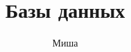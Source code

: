 \documentclass[13pt,a4paper]{scrartcl}
\begin{document}
\title{Базы данных}
\author{Миша}
\maketitle	
















\end{document}
